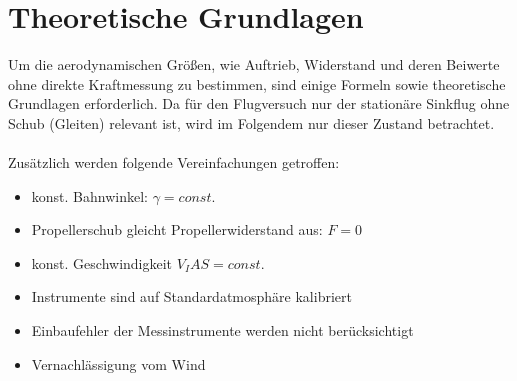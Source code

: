 \chapter{Theoretische Grundlagen}
\label{chapter:theorie}
Um die aerodynamischen Größen, wie Auftrieb, Widerstand und deren Beiwerte ohne direkte Kraftmessung zu bestimmen, sind einige Formeln sowie theoretische Grundlagen erforderlich. Da für den Flugversuch nur der stationäre Sinkflug ohne Schub (Gleiten) relevant ist, wird im Folgendem nur dieser Zustand betrachtet. \\ \\
Zusätzlich werden folgende Vereinfachungen getroffen:
\begin{itemize}
	\item konst. Bahnwinkel: $\gamma = const.$ 
	\item Propellerschub gleicht Propellerwiderstand aus: $F=0$
	\item konst. Geschwindigkeit $V_IAS = const.$
	\item Instrumente sind auf Standardatmosphäre kalibriert
	\item Einbaufehler der Messinstrumente werden nicht berücksichtigt
	\item Vernachlässigung vom Wind
\end{itemize}

